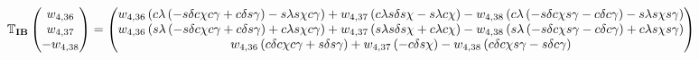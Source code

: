 \begin{equation} \label{eq:DandTInertial}
\mathbb{T}_{\mathbf{IB}}
\begin{pmatrix}
w_{4,36}\\
w_{4,37}\\
-w_{4,38}\\
\end{pmatrix}
=
\left(
\begin{matrix}
w_{4,36}\left( c\lambda\left(-s\delta c\chi c\gamma +c\delta s\gamma \right)-s\lambda s\chi c\gamma \right)  +w_{4,37} \left( c\lambda s\delta s\chi -s\lambda c\chi\right)  -w_{4,38} \left( c\lambda\left(-s\delta c\chi s\gamma -c\delta c\gamma \right)-s\lambda s\chi s\gamma \right) \\
w_{4,36} \left( s\lambda\left(-s\delta c\chi c\gamma +c\delta s\gamma \right)+c\lambda s\chi c\gamma \right) +w_{4,37} \left( s\lambda s\delta s\chi +c\lambda c\chi \right)  -w_{4,38} \left( s\lambda\left(-s\delta c\chi s\gamma -c\delta c\gamma \right)+c\lambda s\chi s\gamma \right) \\
w_{4,36} \left( c\delta c\chi c\gamma +s\delta s\gamma\right) + w_{4,37} \left(  -c\delta s\chi \right) -w_{4,38} \left(  c\delta c\chi s\gamma -s\delta c\gamma \right) \\
\end{matrix}
\right)\\
\end{equation}

